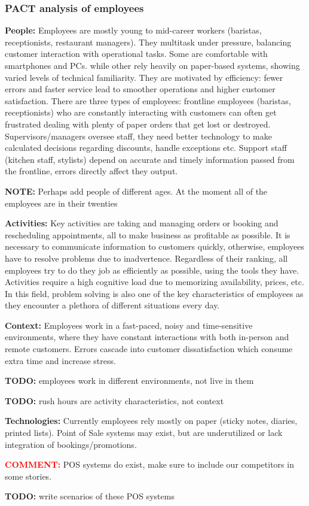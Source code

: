 \documentclass[]{VUMIFTemplateClass}
\newcommand{\yellowcomment}[1]{%
    \begin{tcolorbox}[colback=yellow!80, colframe=yellow!80, arc=0pt, outer arc=0pt, boxrule=0pt, left=3pt, right=3pt, top=3pt, bottom=3pt]
        \textbf{\textcolor{red}{COMMENT:}} #1
    \end{tcolorbox}
}
\newcommand{\noticecomment}[1]{%
    \begin{tcolorbox}[colback=blue!20, colframe=blue!60, arc=0pt, outer arc=0pt, boxrule=1pt, left=3pt, right=3pt, top=3pt, bottom=3pt]
        \textbf{\textcolor{blue!70!black}{NOTE:}} #1
    \end{tcolorbox}
}
\newcommand{\todocomment}[1]{%
    \begin{tcolorbox}[colback=red!20, colframe=red!60, arc=0pt, outer arc=0pt, boxrule=1pt, left=3pt, right=3pt, top=3pt, bottom=3pt]
        \textbf{\textcolor{orange!70!black}{TODO:}} #1
    \end{tcolorbox}
}
\begin{document}
\subsubsection{PACT analysis of employees}
    \textbf{People:} Employees are mostly young to mid-career workers (baristas, receptionists, restaurant managers). They multitask under pressure, balancing customer interaction with operational tasks. Some are comfortable with smartphones and PCs. while other rely heavily on paper-based systems, showing varied levels of technical familiarity. They are motivated by efficiency: fewer errors and faster service lead to smoother operations and higher customer satisfaction. There are three types of employees: frontline employees (baristas, receptionists) who are constantly interacting with customers can often get frustrated dealing with plenty of paper orders that get lost or destroyed. Supervisors/managers oversee staff, they need better technology to make calculated decisions regarding discounts, handle exceptions etc. Support staff (kitchen staff, stylists) depend on accurate and timely information passed from the frontline, errors directly affect they output.

    \noticecomment{Perhaps add people of different ages. At the moment all of the employees are in their twenties}
    

    \textbf{Activities:} Key activities are taking and managing orders or 
booking and rescheduling appointments, all to make business as profitable as possible. It is necessary to communicate information to customers quickly, otherwise, employees have
to resolve problems due to inadvertence. Regardless of their ranking, all employees try to do they job as efficiently as possible, using the tools they have. Activities require a high cognitive load due to memorizing availability, prices, etc. In this field, problem solving is also one of the key characteristics of employees as they encounter a plethora of different situations every day.

    
    \textbf{Context:} Employees work in a fast-paced, noisy and time-sensitive
    environments, where they have constant interactions with both in-person and
    remote customers. Errors cascade into customer
    dissatisfaction which consume extra time and increase stress.

    \todocomment{employees work in different environments, not live in them}
    \todocomment{rush hours are activity characteristics, not context}
    
    \textbf{Technologies:} Currently employees rely mostly on paper (sticky
    notes, diaries, printed lists). Point of Sale systems may exist, but are
    underutilized or lack integration of bookings/promotions.  
    \yellowcomment{POS systems do exist, make sure to include our competitors in some stories.}
    \todocomment{write scenarios of these POS systems}
\end{document}
